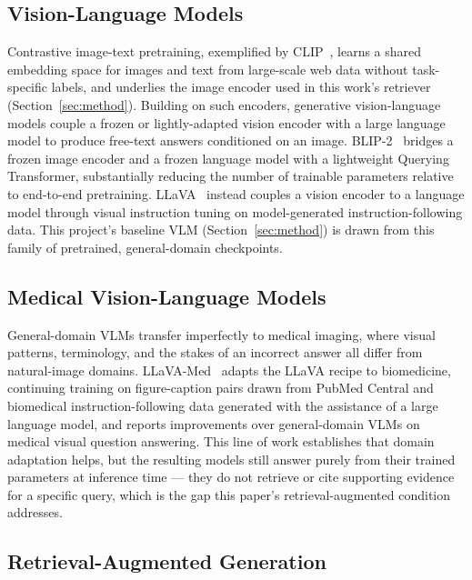 \subsection{Vision-Language Models}

Contrastive image-text pretraining, exemplified by
CLIP~\cite{radford2021clip}, learns a shared embedding space for images and
text from large-scale web data without task-specific labels, and underlies
the image encoder used in this work's retriever
(Section~\ref{sec:method}). Building on such encoders, generative
vision-language models couple a frozen or lightly-adapted vision encoder
with a large language model to produce free-text answers conditioned on an
image. BLIP-2~\cite{li2023blip2} bridges a frozen image encoder and a
frozen language model with a lightweight Querying Transformer, substantially
reducing the number of trainable parameters relative to end-to-end
pretraining. LLaVA~\cite{liu2023llava} instead couples a vision encoder to
a language model through visual instruction tuning on
model-generated instruction-following data. This project's baseline VLM
(Section~\ref{sec:method}) is drawn from this family of pretrained,
general-domain checkpoints.

\subsection{Medical Vision-Language Models}

General-domain VLMs transfer imperfectly to medical imaging, where visual
patterns, terminology, and the stakes of an incorrect answer all differ
from natural-image domains. LLaVA-Med~\cite{li2023llavamed} adapts the
LLaVA recipe to biomedicine, continuing training on figure-caption pairs
drawn from PubMed Central and biomedical instruction-following data
generated with the assistance of a large language model, and reports
improvements over general-domain VLMs on medical visual question answering.
This line of work establishes that domain adaptation helps, but the
resulting models still answer purely from their trained parameters at
inference time --- they do not retrieve or cite supporting evidence for a
specific query, which is the gap this paper's retrieval-augmented condition
addresses.

\subsection{Retrieval-Augmented Generation}

